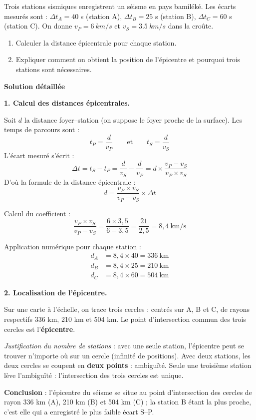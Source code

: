 \documentclass[11pt]{article}
\begin{document}
\begin{exoresolu}
Trois stations sismiques enregistrent un séisme en pays bamiléké. Les écarts mesurés sont : $\Delta t_A = 40$ s (station A), $\Delta t_B = 25$ s (station B), $\Delta t_C = 60$ s (station C). On donne $v_P = \SI{6}{km/s}$ et $v_S = \SI{3,5}{km/s}$ dans la croûte.
\begin{enumerate}
\item Calculer la distance épicentrale pour chaque station.
\item Expliquer comment on obtient la position de l'épicentre et pourquoi trois stations sont nécessaires.
\end{enumerate}
\tcblower
\textbf{Solution détaillée}

\textbf{1. Calcul des distances épicentrales.}

Soit $d$ la distance foyer--station (on suppose le foyer proche de la surface). Les temps de parcours sont :
\[ t_P = \dfrac{d}{v_P} \qquad \text{et} \qquad t_S = \dfrac{d}{v_S} \]
L'écart mesuré s'écrit :
\[ \Delta t = t_S - t_P = \dfrac{d}{v_S} - \dfrac{d}{v_P} = d \times \dfrac{v_P - v_S}{v_P \times v_S} \]
D'où la formule de la distance épicentrale :
\[ d = \dfrac{v_P \times v_S}{v_P - v_S} \times \Delta t \]

Calcul du coefficient :
\[ \dfrac{v_P \times v_S}{v_P - v_S} = \dfrac{6 \times 3{,}5}{6 - 3{,}5} = \dfrac{21}{2{,}5} = 8{,}4~\text{km/s} \]

Application numérique pour chaque station :
\begin{align*}
d_A &= 8{,}4 \times 40 = 336~\text{km} \\
d_B &= 8{,}4 \times 25 = 210~\text{km} \\
d_C &= 8{,}4 \times 60 = 504~\text{km}
\end{align*}

\textbf{2. Localisation de l'épicentre.}

Sur une carte à l'échelle, on trace trois cercles : centrés sur A, B et C, de rayons respectifs 336 km, 210 km et 504 km. Le point d'intersection commun des trois cercles est l'\textbf{épicentre}.

\textit{Justification du nombre de stations} : avec une seule station, l'épicentre peut se trouver n'importe où sur un cercle (infinité de positions). Avec deux stations, les deux cercles se coupent en \textbf{deux points} : ambiguïté. Seule une troisième station lève l'ambiguïté : l'intersection des trois cercles est unique.

\textbf{Conclusion} : l'épicentre du séisme se situe au point d'intersection des cercles de rayon 336 km (A), 210 km (B) et 504 km (C) ; la station B étant la plus proche, c'est elle qui a enregistré le plus faible écart S--P.
\end{exoresolu}
\end{document}
